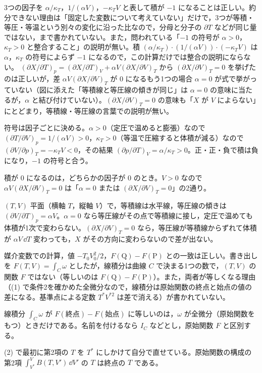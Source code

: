 \begin{kotaeran}
   3つの因子を $\alpha/\kappa_{T}$，$1/(\alpha V)$，$-\kappa_{T}V$ と表して積が $-1$ になることは正しい。約分できない理由は「固定した変数について考えていない」だけで，3つが等積・等圧・等温という別々の変化に沿った比なので，分母と分子の $\partial T$ などが同じ量ではない，まで書かれていない。また，問われている「$-1$ の符号が $\alpha>0$，$\kappa_{T}>0$ と整合すること」の説明が無い。積 $(\alpha/\kappa_{T})\cdot(1/(\alpha V))\cdot(-\kappa_{T}V)$ は $\alpha$，$\kappa_{T}$ の符号によらず $-1$ になるので，この計算だけでは整合の説明にならない。
   $(\partial X/\partial T)_{p}=(\partial X/\partial T)_{V}+\alpha V(\partial X/\partial V)_{T}$ から $(\partial X/\partial V)_{T}=0$ を挙げたのは正しいが，差 $\alpha V(\partial X/\partial V)_{T}$ が 0 になるもう1つの場合 $\alpha=0$ が式で挙がっていない（図に添えた「等積線と等圧線の傾きが同じ」は $\alpha=0$ の意味に当たるが，$\alpha$ と結び付けていない）。$(\partial X/\partial V)_{T}=0$ の意味も「$X$ が $V$ によらない」にとどまり，等積線・等圧線の言葉での説明が無い。
\end{kotaeran}
\begin{rikai}
  \item 符号は因子ごとに決める。$\alpha>0$（定圧で温めると膨張）なので $(\partial T/\partial V)_{p}=1/(\alpha V)>0$，$\kappa_{T}>0$（等温で圧縮すると体積が減る）なので $(\partial V/\partial p)_{T}=-\kappa_{T}V<0$，その結果 $(\partial p/\partial T)_{V}=\alpha/\kappa_{T}>0$。正・正・負で積は負になり，$-1$ の符号と合う。
  \item 積が 0 になるのは，どちらかの因子が 0 のとき。$V>0$ なので $\alpha V(\partial X/\partial V)_{T}=0$ は「$\alpha=0$ または $(\partial X/\partial V)_{T}=0$」の2通り。
  \item $(T,V)$ 平面（横軸 $T$，縦軸 $V$）で，等積線は水平線，等圧線の傾きは $(\partial V/\partial T)_{p}=\alpha V$。$\alpha=0$ なら等圧線がその点で等積線に接し，定圧で温めても体積が1次で変わらない。$(\partial X/\partial V)_{T}=0$ なら，等圧線が等積線からずれて体積が $\alpha V\,\dd T$ 変わっても，$X$ がその方向に変わらないので差が出ない。
\end{rikai}
\begin{kotaeran}
   媒介変数での計算，値 $-T_{0}V_{0}^{2}/2$，$F(\mathrm{Q})-F(\mathrm{P})$ との一致は正しい。書き出しを $F(T,V)=\int_{C}\omega$ としたが，線積分は曲線 $C$ で決まる1つの数で，$(T,V)$ の関数 $F$ ではない（等しいのは $F(\mathrm{Q})-F(\mathrm{P})$）。また，両者が等しくなる理由（(1) で条件2を確かめた全微分なので，線積分は原始関数の終点と始点の値の差になる。基準点による定数 $T^{*}V^{*2}$ は差で消える）が書かれていない。
\end{kotaeran}
\begin{rikai}
  \item 線積分 $\int_{C}\omega$ が $F(\text{終点})-F(\text{始点})$ に等しいのは，$\omega$ が全微分（原始関数をもつ）ときだけである。名前を付けるなら $I_{C}$ などとし，原始関数 $F$ と区別する。
  \item (2) で最初に第2項の $T$ を $T^{*}$ にしかけて自分で直せている。原始関数の構成の第2項 $\int_{V^{*}}^{V}B(T,V')\,\dd V'$ の $T$ は終点の $T$ である。
\end{rikai}
